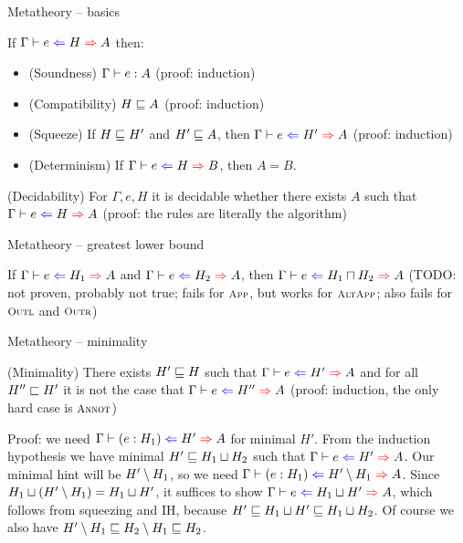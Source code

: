 \documentclass{beamer}
\begin{document}
\begin{frame}{Metatheory -- basics}

If $\hinting[\Gamma]{e}{H}{A}$ then:

\begin{itemize}
  \item (Soundness) $\typing[\Gamma]{e}{A}$ (proof: induction)
  \item (Compatibility) $H \sqsubseteq A$ (proof: induction)
  \item (Squeeze) If $H \sqsubseteq H'$ and $H' \sqsubseteq A$, then $\hinting[\Gamma]{e}{H'}{A}$ (proof: induction)
  \item (Determinism) If $\hinting{e}{H}{B}$, then $A = B$.
\end{itemize}

\vspace{2em}

(Decidability) For $\Gamma, e, H$ it is decidable whether there exists $A$ such that $\hinting[\Gamma]{e}{H}{A}$ (proof: the rules are literally the algorithm)

\end{frame}


\begin{frame}{Metatheory -- greatest lower bound}

If $\hinting{e}{H_1}{A}$ and $\hinting{e}{H_2}{A}$, then $\hinting{e}{\hintglb{H_1}{H_2}}{A}$ (TODO: not proven, probably not true; fails for $\textsc{\footnotesize{App}}$, but works for $\textsc{\footnotesize{AltApp}}$; also fails for $\textsc{\footnotesize{Outl}}$ and $\textsc{\footnotesize{Outr}}$)

\end{frame}

\begin{frame}{Metatheory -- minimality}

(Minimality) There exists $H' \sqsubseteq H$ such that $\hinting[\Gamma]{e}{H'}{A}$ and for all $H'' \sqsubset H'$ it is not the case that $\hinting[\Gamma]{e}{H''}{A}$ (proof: induction, the only hard case is $\textsc{\footnotesize{Annot}}$)

\vspace{1em}

Proof: we need $\hinting{\annot{e}{H_1}}{H'}{A}$ for minimal $H'$. From the induction hypothesis we have minimal $H' \sqsubseteq H_1 \sqcup H_2$ such that $\hinting{e}{H'}{A}$. Our minimal hint will be $H' \setminus H_1$, so we need $\hinting{\annot{e}{H_1}}{\hintdiff{H'}{H_1}}{A}$. Since $H_1 \sqcup (H' \setminus H_1) = H_1 \sqcup H'$, it suffices to show $\hinting{e}{\hintlub{H_1}{H'}}{A}$, which follows from squeezing and IH, because $H' \sqsubseteq H_1 \sqcup H' \sqsubseteq H_1 \sqcup H_2$. Of course we also have $H' \setminus H_1 \sqsubseteq H_2 \setminus H_1 \sqsubseteq H_2$.

\end{frame}
\end{document}
